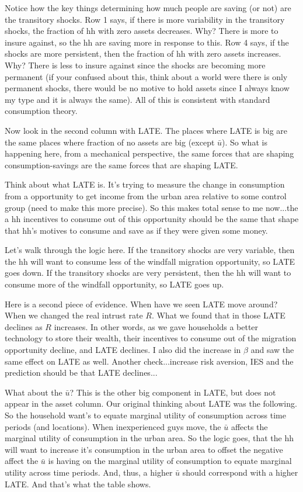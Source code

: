 \documentclass[pdftex,11pt]{article}
\begin{document}
Notice how the key things determining how much people are saving (or not) are the transitory shocks. Row 1 says, if there is more variability in the transitory shocks, the fraction of hh with zero assets decreases. Why? There is more to insure against, so the hh are saving more in response to this.  Row 4 says, if the shocks are more persistent, then the fraction of hh with zero assets increases. Why? There is less to insure against since the shocks are becoming more permanent (if your confused about this, think about a world were there is only permanent shocks, there would be no motive to hold assets since I always know my type and it is always the same). All of this is consistent with standard consumption theory.

Now look in the second column with LATE. The places where LATE is big are the same places where fraction of no assets are big (except $\bar u$). So what is happening here, from a mechanical perspective, the same forces that are shaping consumption-savings are the same forces that are shaping LATE.

Think about what LATE is. It's trying to measure the change in consumption from a opportunity to get income from the urban area relative to some control group (need to make this more precise). So this makes total sense to me now...the a hh incentives to consume out of this opportunity should be the same that shape that hh's motives to consume and save as if they were given some money.

Let's walk through the logic here. If the transitory shocks are very variable, then the hh will want to consume less of the windfall migration opportunity, so LATE goes down. If the transitory shocks are very persistent, then the hh will want to consume more of the windfall opportunity, so LATE goes up.

Here is a second piece of evidence. When have we seen LATE move around? When we changed the real intrust rate $R$. What we found that in those LATE declines as $R$ increases. In other words, as we gave households a better technology to store their wealth, their incentives to consume out of the migration opportunity decline, and LATE declines. I also did the increase in $\beta$ and saw the same effect on LATE as well. Another check...increase risk aversion, IES and the prediction should be that LATE declines...

What about the $\bar u$? This is the other big component in LATE, but does not appear in the asset column. Our original thinking about LATE was the following. So the household want's to equate marginal utility of consumption across time periods (and locations). When inexperienced guys move, the $\bar u$ affects the marginal utility of consumption in the urban area. So the logic goes, that the hh will want to increase it's consumption in the urban area to offset the negative affect the $\bar u$ is having on the marginal utility of consumption to equate marginal utility across time periods. And, thus, a higher $\bar u$ should correspond with a higher LATE. And that's what the table shows.
\end{document}
